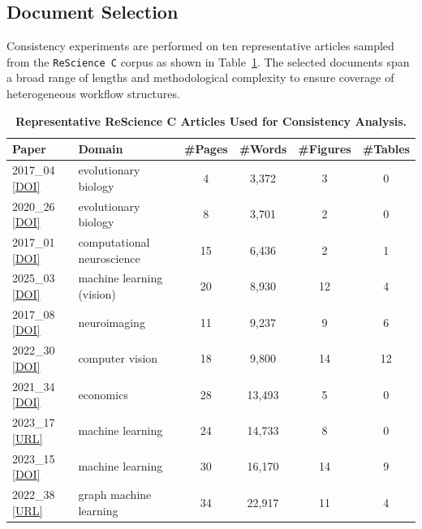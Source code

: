 \documentclass{article}
\begin{document}
\subsection{Document Selection}
Consistency experiments are performed on ten representative articles sampled from the \texttt{ReScience C} corpus as shown in Table~\ref{tab:rescience-sample}.
The selected documents span a broad range of lengths and methodological complexity to ensure coverage of heterogeneous workflow structures.

\begin{table}[!h]
    \centering
    \caption{\textbf{Representative ReScience C Articles Used for Consistency Analysis.}}
    \label{tab:rescience-sample}
    \begin{tabularx}{\linewidth}{lXcccc}
        \toprule
        \textbf{Paper} & \textbf{Domain} & \textbf{\#Pages} & \textbf{\#Words} & \textbf{\#Figures} & \textbf{\#Tables} \\
        \midrule
        2017\_04 \href{https://www.doi.org/10.1038/nature04605}{[DOI]} & evolutionary biology & 4  & 3,372  & 3  & 0 \\
        2020\_26 \href{https://www.doi.org/10.1016/j.tpb.2009.10.003}{[DOI]} & evolutionary biology & 8  & 3,701  & 2  & 0 \\
        2017\_01 \href{https://www.doi.org/10.1162/neco.2008.12-07-680}{[DOI]}  & computational neuroscience & 15 & 6,436  & 2  & 1 \\
        2025\_03 \href{https://www.doi.org/10.48550/arXiv.1905.11926}{[DOI]} & machine learning (vision) & 20 & 8,930  & 12 & 4 \\
        2017\_08 \href{https://www.doi.org/10.1016/j.neuroimage.2014.09.053}{[DOI]} & neuroimaging & 11 & 9,237  & 9  & 6 \\
        2022\_30 \href{https://www.doi.org/10.48550/arXiv.2011.00844}{[DOI]} & computer vision & 18 & 9,800  & 14 & 12 \\
        2021\_34 \href{https://www.doi.org/10.1111/1468-0262.00112}{[DOI]} & economics & 28 & 13,493 & 5  & 0 \\
        2023\_17 \href{https://openreview.net/forum?id=wbPObLm6ueA}{[URL]} & machine learning & 24 & 14,733 & 8  & 0 \\
        2023\_15 \href{https://www.doi.org/10.48550/arXiv.2203.01928}{[DOI]} & machine learning & 30 & 16,170 & 14 & 9 \\
        2022\_38 \href{https://openreview.net/forum?id=dlEJsyHGeaL}{[URL]} & graph machine learning & 34 & 22,917 & 11 & 4 \\
        \bottomrule
    \end{tabularx}
\end{table}
\end{document}
